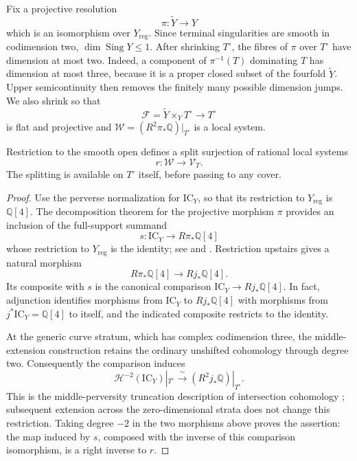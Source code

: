 Fix a projective resolution
\[
 \pi:\widetilde Y\longrightarrow Y
\]
which is an isomorphism over $Y_{\mathrm{reg}}$.  Since terminal
singularities are smooth in codimension two, $\dim\operatorname{Sing}Y
\leq1$.  After shrinking $T^\circ$, the fibres of $\pi$ over $T^\circ$
have dimension at most two.  Indeed, a component of $\pi^{-1}(T)$
dominating $T$ has dimension at most three, because it is a proper
closed subset of the fourfold $\widetilde Y$.  Upper semicontinuity then
removes the finitely many possible dimension jumps.  We also shrink so
that
\[
 \mathcal F=\widetilde Y\times_Y T^\circ\longrightarrow T^\circ
\]
is flat and projective and
$\mathcal W=(R^2\pi_*\mathbb Q)|_{T^\circ}$ is a local system.

\begin{lemma}\label{local:split-punctured}
Restriction to the smooth open defines a split surjection of rational
local systems
\[
 r:\mathcal W\longrightarrow\mathcal V_T.
\]
The splitting is available on $T^\circ$ itself, before passing to any
cover.
\end{lemma}

\begin{proof}
Use the perverse normalization for $\mathrm{IC}_Y$, so that its restriction to
$Y_{\mathrm{reg}}$ is $\mathbb Q[4]$.  The decomposition theorem for the
projective morphism $\pi$ provides an inclusion of the full-support
summand
\[
 s:\mathrm{IC}_Y\longrightarrow R\pi_*\mathbb Q[4]
\]
whose restriction to $Y_{\mathrm{reg}}$ is the identity; see
\cite[Theorem~5.3.1]{Saito1988} and
\cite[\S\S1.7--1.13]{Saito1989}.
Restriction upstairs gives a natural morphism
\[
 R\pi_*\mathbb Q[4]\longrightarrow Rj_*\mathbb Q[4].
\]
Its composite with $s$ is the canonical comparison
$\mathrm{IC}_Y\to Rj_*\mathbb Q[4]$.  In fact, adjunction identifies morphisms
from $\mathrm{IC}_Y$ to $Rj_*\mathbb Q[4]$ with morphisms from
$j^*\mathrm{IC}_Y=\mathbb Q[4]$ to itself, and the indicated composite restricts
to the identity.

At the generic curve stratum, which has complex codimension three,
the middle-extension construction retains the ordinary unshifted
cohomology through degree two.  Consequently the comparison induces
\[
 \mathcal H^{-2}(\mathrm{IC}_Y)|_{T^\circ}
   \xrightarrow{\ \sim\ }(R^2j_*\mathbb Q)|_{T^\circ}.
\]
This is the middle-perversity truncation description of intersection
cohomology \cite[\S2]{GM1983}; subsequent extension across the
zero-dimensional strata does not change this restriction.  Taking
degree $-2$ in the two morphisms above proves the assertion: the map
induced by $s$, composed with the inverse of this comparison
isomorphism, is a right inverse to $r$.
\end{proof}

